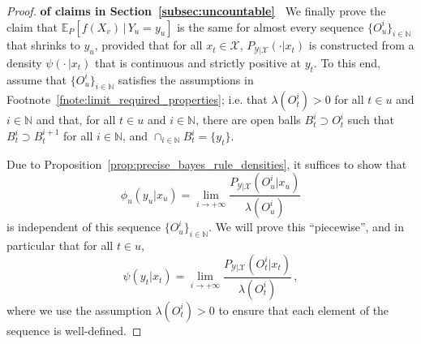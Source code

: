 \documentclass[twoside,11pt]{article}
\newcommand{\nats}{\mathbb{N}}
\newcommand{\states}{\mathcal{X}}
\newcommand{\observs}{\mathcal{Y}}
\begin{document}
\begin{proof}{\bf of claims in Section~\ref{subsec:uncountable}~}
We finally prove the claim that $\mathbb{E}_P[f(X_v)\,\vert\,Y_u=y_u]$ is the same for almost every sequence $\{O_u^i\}_{i\in\nats}$ that shrinks to $y_u$, provided that for all $x_t\in\states$, $P_{\observs\vert\states}(\cdot\vert x_t)$ is constructed from a density $\psi(\cdot\,\vert x_t)$ that is continuous and strictly positive at $y_t$. To this end, assume that $\{O_u^i\}_{i\in\nats}$ satisfies the assumptions in Footnote~\ref{fnote:limit_required_properties}; i.e. that $\lambda(O_t^i)>0$ for all $t\in u$ and $i\in\nats$ and that, for all $t\in u$ and $i\in\nats$, there are open balls $B_t^i\supset O_t^i$ such that $B_t^i\supset B_t^{i+1}$ for all $i\in\nats$, and $\cap_{i\in\nats}B_t^i=\{y_t\}$.

Due to Proposition~\ref{prop:precise_bayes_rule_densities}, it suffices to show that
\begin{equation*}
\phi_u(y_u\vert x_u) = \lim_{i\to+\infty} \frac{P_{\observs\vert\states}(O_u^i\vert x_u)}{\lambda(O_u^i)}
\end{equation*}
is independent of this sequence $\{O_u^i\}_{i\in\nats}$. We will prove this ``piecewise'', and in particular that for all $t\in u$,
\begin{equation*}
\psi(y_t\vert x_t) = \lim_{i\to+\infty} \frac{P_{\observs\vert\states}(O_t^i\vert x_t)}{\lambda(O_t^i)}\,,
\end{equation*}
where we use the assumption $\lambda(O_t^i)>0$ to ensure that each element of the sequence is well-defined.


\end{proof}
\end{document}
